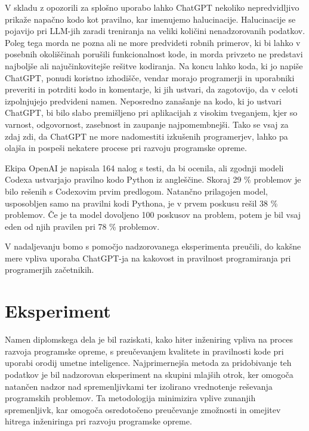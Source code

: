 \documentclass[a4paper,12pt,openright]{book}
\begin{document}
V skladu z opozorili za splošno uporabo lahko ChatGPT nekoliko nepredvidljivo prikaže napačno kodo kot pravilno, kar imenujemo halucinacije. Halucinacije se pojavijo pri LLM-jih zaradi treniranja na veliki količini nenadzorovanih podatkov. \cite{alkaissi2023artificial} \\
Poleg tega morda ne pozna ali ne more predvideti robnih primerov, ki bi lahko v posebnih okoliščinah porušili funkcionalnost kode, in morda privzeto ne predstavi najboljše ali najučinkovitejše rešitve kodiranja. Na koncu lahko koda, ki jo napiše ChatGPT, ponudi koristno izhodišče, vendar morajo programerji in uporabniki preveriti in potrditi kodo in komentarje, ki jih ustvari, da zagotovijo, da v celoti izpolnjujejo predvideni namen. Neposredno zanašanje na kodo, ki jo ustvari ChatGPT, bi bilo slabo premišljeno pri aplikacijah z visokim tveganjem, kjer so varnost, odgovornost, zasebnost in zaupanje najpomembnejši. Tako se vsaj za zdaj zdi, da ChatGPT ne more nadomestiti izkušenih programerjev, lahko pa olajša in pospeši nekatere procese pri razvoju programske opreme.
\cite{Meyer2023}

Ekipa OpenAI je napisala 164 nalog s testi, da bi ocenila, ali
zgodnji modeli Codexa ustvarjajo pravilno kodo Python iz angleščine. Skoraj 29 \% problemov je bilo rešenih s Codexovim prvim predlogom. 
Natančno prilagojen model, usposobljen samo na pravilni kodi Pythona,
je v prvem poskusu rešil 38 \% problemov. Če je ta model
dovoljeno 100 poskusov na problem, potem je bil vsaj eden od njih
pravilen pri 78 \% problemov. \cite{DBLP:journals/corr/abs-2107-03374}

V nadaljevanju bomo s pomočjo nadzorovanega eksperimenta preučili, do kakšne mere vpliva uporaba ChatGPT-ja na kakovost in pravilnost programiranja pri programerjih začetnikih.


\chapter{Eksperiment}

Namen diplomskega dela je bil raziskati, kako hiter inženiring vpliva na proces razvoja programske opreme, s preučevanjem kvalitete in pravilnosti kode pri uporabi orodij umetne inteligence. Najprimernejša metoda za pridobivanje teh podatkov je bil nadzorovan eksperiment na skupini mlajših otrok, ker omogoča natančen nadzor nad spremenljivkami ter izolirano vrednotenje reševanja programskih problemov. Ta metodologija minimizira vplive zunanjih spremenljivk, kar omogoča osredotočeno preučevanje zmožnosti in omejitev hitrega inženiringa pri razvoju programske opreme.
\end{document}
